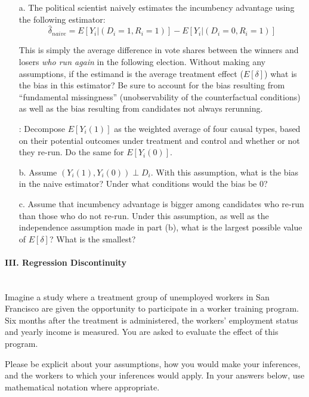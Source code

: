 \documentclass{article}
\begin{document}
\begin{itemize}
\item[a.]  The political scientist naively estimates the incumbency
  advantage using the following estimator: 
$$\hat{\delta}_{naive} = E[Y_i|(D_i = 1, R_i
= 1)] - E[Y_i|(D_i = 0, R_i = 1)]$$

This is simply the average difference in vote shares between the
winners and losers {\em who run again} in the following
election. Without making any assumptions, if the estimand is the
average treatment effect ($E[\delta]$) what is the bias in this
estimator? Be sure to account for the bias resulting from
``fundamental missingness'' (unobservability of the counterfactual
conditions) as well as the bias resulting from candidates not always
rerunning.


: Decompose $E[Y_i(1)]$ as the weighted average of
four causal types, based on their potential outcomes under treatment
and control and whether or not they re-run. Do the same for
$E[Y_i(0)]$.

\item[b.] Assume $(Y_i(1),Y_i(0)) \perp D_i$. With this assumption,
  what is the bias in the naive estimator? Under what conditions would
  the bias be 0?

\item[c.]  Assume that incumbency advantage is bigger among candidates
  who re-run than those who do not re-run. Under this assumption, as
  well as the independence assumption made in part (b), what is the
  largest possible value of $E[\delta]$? What is the smallest?
\end{itemize}

\paragraph{\Large III. Regression Discontinuity \\ \\}

Imagine a study where a treatment group of unemployed workers in San
Francisco are given the opportunity to participate in a worker
training program. Six months after the treatment is administered, the
workers' employment status and yearly income is measured. You are
asked to evaluate the effect of this program.

Please be explicit about your assumptions, how you would make your
inferences, and the workers to which your inferences would apply. In
your answers below, use mathematical notation where appropriate.
\end{document}
